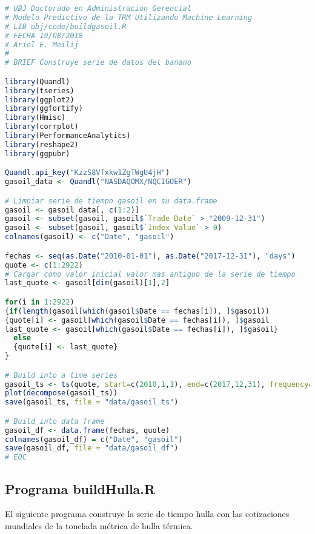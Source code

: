 \begin{lstlisting}[language=R]
# UBJ Doctorado en Administracion Gerencial
# Modelo Predictivo de la TRM Utilizando Machine Learning
# LIB ubj/code/buildgasoil.R
# FECHA 19/08/2018
# Ariel E. Meilij
#
# BRIEF Construye serie de datos del banano

library(Quandl)
library(tseries)
library(ggplot2)
library(ggfortify)
library(Hmisc)
library(corrplot)
library(PerformanceAnalytics)
library(reshape2)
library(ggpubr)

Quandl.api_key("KzzS8Vfxkw1ZgTWgU4jH")
gasoil_data <- Quandl("NASDAQOMX/NQCIGOER")

# Limpiar serie de tiempo gasoil en su data.frame
gasoil <- gasoil_data[, c(1:2)]
gasoil <- subset(gasoil, gasoil$`Trade Date` > "2009-12-31")
gasoil <- subset(gasoil, gasoil$`Index Value` > 0)
colnames(gasoil) <- c("Date", "gasoil")

fechas <- seq(as.Date("2010-01-01"), as.Date("2017-12-31"), "days")
quote <- c(1:2922)
# Cargar como valor inicial valor mas antiguo de la serie de tiempo
last_quote <- gasoil[dim(gasoil)[1],2]

for(i in 1:2922)
{if(length(gasoil[which(gasoil$Date == fechas[i]), ]$gasoil))
{quote[i] <- gasoil[which(gasoil$Date == fechas[i]), ]$gasoil
last_quote <- gasoil[which(gasoil$Date == fechas[i]), ]$gasoil}
  else
  {quote[i] <- last_quote}
}

# Build into a time series
gasoil_ts <- ts(quote, start=c(2010,1,1), end=c(2017,12,31), frequency=365)
plot(decompose(gasoil_ts))
save(gasoil_ts, file = "data/gasoil_ts")

# Build into data frame
gasoil_df <- data.frame(fechas, quote)
colnames(gasoil_df) = c("Date", "gasoil")
save(gasoil_df, file = "data/gasoil_df")
# EOC
\end{lstlisting}

\subsection{Programa buildHulla.R}
El siguiente programa construye la serie de tiempo hulla con las cotizaciones mundiales de la tonelada métrica de hulla térmica.

